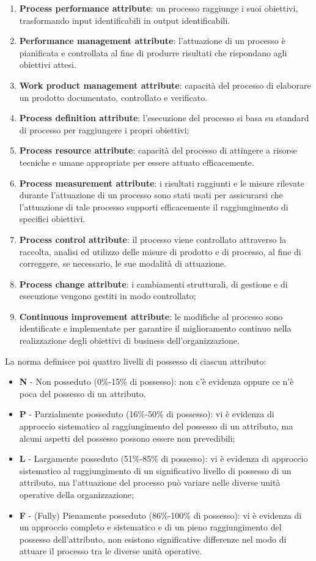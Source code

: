 \begin{enumerate}
    \item \textbf{Process performance attribute}: un processo raggiunge i suoi obiettivi, trasformando input identificabili in output identificabili.
    \item \textbf{Performance management attribute}: l'attuazione di un processo è pianificata e controllata al fine di produrre risultati che rispondano agli obiettivi attesi.
    \item \textbf{Work product management attribute}: capacità del processo di elaborare un prodotto documentato, controllato e verificato.
    \item \textbf{Process definition attribute}: l'esecuzione del processo si basa su standard di processo per raggiungere i propri obiettivi;
    \item \textbf{Process resource attribute}: capacità del processo di attingere a risorse tecniche e umane appropriate per essere attuato efficacemente.
    \item \textbf{Process measurement attribute}: i risultati raggiunti e le misure rilevate durante l'attuazione di un processo sono stati usati per assicurarsi che l'attuazione di tale processo supporti efficacemente il raggiungimento di specifici obiettivi.
    \item \textbf{Process control attribute}: il processo viene controllato attraverso la raccolta, analisi ed utilizzo delle misure di prodotto e di processo, al fine di correggere, se necessario, le sue modalità di attuazione.
    \item \textbf{Process change attribute}: i cambiamenti strutturali, di gestione e di esecuzione vengono gestiti in modo controllato;
    \item \textbf{Continuous improvement attribute}: le modifiche al processo sono identificate e implementate per garantire il miglioramento continuo nella realizzazione degli obiettivi di business dell'organizzazione.
\end{enumerate}
\smallskip
La norma definisce poi quattro livelli di possesso di ciascun attributo:
\smallskip
\begin{itemize}
	\item \textbf{N} - Non posseduto (0\%-15\% di possesso): non c'è evidenza oppure ce n'è poca del possesso di un attributo.
	\item \textbf{P} - Parzialmente posseduto (16\%-50\% di possesso): vi è evidenza di approccio sistematico al raggiungimento del possesso di un attributo, ma alcuni aspetti del possesso possono essere non prevedibili;
    \item \textbf{L} - Largamente posseduto (51\%-85\% di possesso): vi è evidenza di approccio sistematico al raggiungimento di un significativo livello di possesso di un attributo, ma l'attuazione del processo può variare nelle diverse unità operative della organizzazione;
	\item \textbf{F} - (Fully) Pienamente posseduto (86\%-100\% di possesso): vi è evidenza di un approccio completo e sistematico e di un pieno raggiungimento del possesso dell'attributo, non esistono significative differenze nel modo di attuare il processo tra le diverse unità operative.
\end{itemize}
